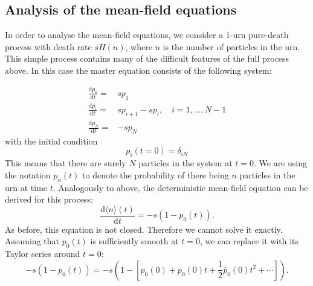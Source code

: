 \documentclass[a4paper,11pt]{article}
\numberwithin{equation}{section}
\newcommand{\diff}[2]{\frac{\mathrm{d} #1}{\mathrm{d} #2}}
\newcommand{\E}[1]{\langle #1 \rangle}
\begin{document}
\FloatBarrier
\subsection{Analysis of the mean-field equations}
In order to analyse the mean-field equations, we consider a 1-urn pure-death
process with death rate \(s H(n)\), where \(n\) is the number of particles in
the urn. This simple process contains many of the difficult features of the full
process above. In this case the master equation consists of the following system:

\begin{align*}
    \diff{p_0}{t} =& s p_1\\
    \diff{p_i}{t} =& s p_{i+1} - s p_i, \quad i = 1,\dotsc,N-1\\
    \diff{p_N}{t} =& - s p_N
\end{align*}
with the initial condition
\begin{equation}
    \label{eqn:pure_death_ic}
    p_i(t=0) = \delta_{iN}
\end{equation}
This means that there are surely \(N\) particles in the system at \(t=0\). We
are using the notation \(p_n(t)\) to denote the probability of there being \(n\)
particles in the urn at time \(t\).  Analogously to above, the deterministic
mean-field equation can be derived for this process:
\begin{equation*}
    \diff{\E{n}(t)}{t} = -s \left(1-p_0(t)\right).
\end{equation*}
As before, this equation is not closed. Therefore we cannot solve it exactly.
Assuming that \(p_0(t)\) is sufficiently smooth at \(t=0\), we can replace it
with its Taylor series around \(t=0\):
\begin{equation*}
    -s(1-p_0(t)) = -s\left(1 - \left[p_0(0) + \dot{p_0}(0)t +
    \frac{1}{2}\ddot{p_0}(0)t^2 + \dotsb \right] \right).
\end{equation*}
\end{document}
